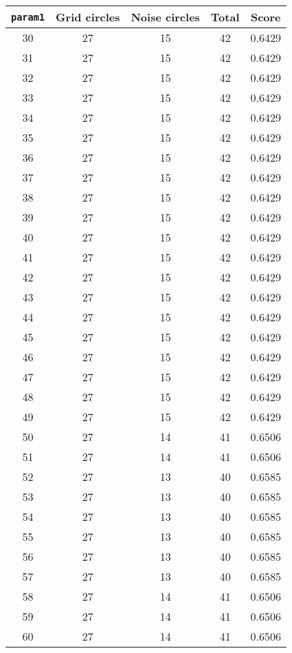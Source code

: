 \documentclass[letterpaper, 12pt]{article}
\begin{document}
\begin{longtable}{|c|c|c|c|c|}
\hline
\textbf{\texttt{param1}} & \textbf{Grid circles} & \textbf{Noise circles} & \textbf{Total} & \textbf{Score} \\
\hline
30 & 27 & 15 & 42 & 0.6429 \\
\hline
31 & 27 & 15 & 42 & 0.6429 \\
\hline
32 & 27 & 15 & 42 & 0.6429 \\
\hline
33 & 27 & 15 & 42 & 0.6429 \\
\hline
34 & 27 & 15 & 42 & 0.6429 \\
\hline
35 & 27 & 15 & 42 & 0.6429 \\
\hline
36 & 27 & 15 & 42 & 0.6429 \\
\hline
37 & 27 & 15 & 42 & 0.6429 \\
\hline
38 & 27 & 15 & 42 & 0.6429 \\
\hline
39 & 27 & 15 & 42 & 0.6429 \\
\hline
40 & 27 & 15 & 42 & 0.6429 \\
\hline
41 & 27 & 15 & 42 & 0.6429 \\
\hline
42 & 27 & 15 & 42 & 0.6429 \\
\hline
43 & 27 & 15 & 42 & 0.6429 \\
\hline
44 & 27 & 15 & 42 & 0.6429 \\
\hline
45 & 27 & 15 & 42 & 0.6429 \\
\hline
46 & 27 & 15 & 42 & 0.6429 \\
\hline
47 & 27 & 15 & 42 & 0.6429 \\
\hline
48 & 27 & 15 & 42 & 0.6429 \\
\hline
49 & 27 & 15 & 42 & 0.6429 \\
\hline
50 & 27 & 14 & 41 & 0.6506 \\
\hline
51 & 27 & 14 & 41 & 0.6506 \\
\hline
52 & 27 & 13 & 40 & 0.6585 \\
\hline
53 & 27 & 13 & 40 & 0.6585 \\
\hline
54 & 27 & 13 & 40 & 0.6585 \\
\hline
55 & 27 & 13 & 40 & 0.6585 \\
\hline
56 & 27 & 13 & 40 & 0.6585 \\
\hline
57 & 27 & 13 & 40 & 0.6585 \\
\hline
58 & 27 & 14 & 41 & 0.6506 \\
\hline
59 & 27 & 14 & 41 & 0.6506 \\
\hline
60 & 27 & 14 & 41 & 0.6506 \\

\end{longtable}
\end{document}
